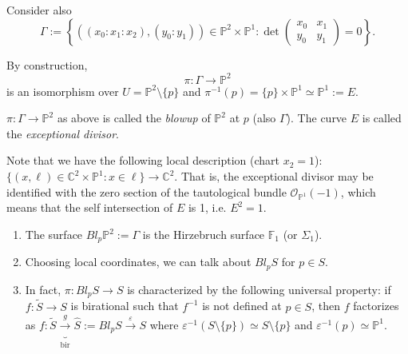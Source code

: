 \noindent
Consider also
$$
\Gamma:=\left\{((x_0:x_1:x_2),(y_0:y_1)) \in
\mathbb{P}^2\times \mathbb{P}^1
: \det\begin{pmatrix}x_0&x_1\\
y_0&y_1\end{pmatrix}=0\right\}.
$$

By construction,
$$
\pi:\Gamma \to \mathbb{P}^2
$$
is an isomorphism over $U=\mathbb{P}^2
\setminus \{p\}$
and $\pi^{-1}(p)=\{p\}\times \mathbb{P}^1
\simeq\mathbb{P}^1:=E$.

\begin{definition}
\label{definition-blow-up}
$\pi:\Gamma \to \mathbb{P}^2$ as above is
called
the {\it blowup} of $\mathbb{P}^2$ at $p$
(also $\Gamma$). The curve $E$ is called
the {\it exceptional divisor}.
\end{definition}

\noindent
Note that we have the following local
description
(chart $x_2=1$):
$\{(x,\ell) \in \mathbb{C}^2\times
\mathbb{P}^1: x \in \ell\}
\to \mathbb{C}^2$.
That is, the exceptional divisor may be
identified with
the zero section of the tautological bundle
$\mathcal{O}_{\mathbb{P}^1}(-1)$,
which means that the self intersection of $E$
is 1,
i.e. $E^2=1$.

\begin{remark}
\label{remark-blowup}
\begin{enumerate}
\item The surface $Bl_p\mathbb{P}^2:=\Gamma$
is the Hirzebruch surface $\mathbb{F}_1$ (or
$\Sigma_1$).

\item Choosing local coordinates, we can talk
about
$Bl_p S$ for $p \in S$.

\item In fact, $\pi:Bl_pS \to S$
is characterized by the following universal
property:
if $f:\tilde{S}\to S$ is birational such that
$f^{-1}$
is not defined at $p \in S$, then $f$
factorizes
as $f:\tilde{S}
\underbrace{\xrightarrow{g}}_{\text{bir}}
\hat{S}:=Bl_pS \xrightarrow{\varepsilon} S$
where $\varepsilon^{-1}(S\setminus \{p\})
\simeq S \setminus \{p\}$
and $\varepsilon^{-1}(p) \simeq
\mathbb{P}^1$.
\end{enumerate}
\end{remark}

